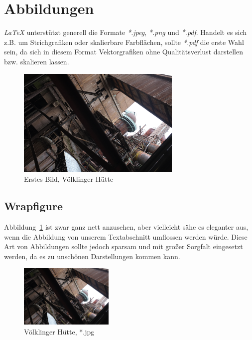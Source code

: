 \section{Abbildungen}

\textit{LaTeX} unterstützt generell die Formate \textit{*.jpeg}, \textit{*.png} und \textit{*.pdf}.
Handelt es sich z.B. um Strichgrafiken oder skalierbare Farbflächen, sollte \textit{*.pdf} die erste Wahl sein,
da sich in diesem Format Vektorgrafiken ohne Qualitätsverlust darstellen bzw. skalieren lassen.

\begin{figure}[bth] 
  \centering
  \includegraphics[width=0.7\textwidth]{Examples/example_5.png}
  \caption{Erstes Bild, Völklinger Hütte}
  \label{fig:Huette}
\end{figure}


\subsection{Wrapfigure}
Abbildung~\ref{fig:Huette} ist zwar ganz nett anzusehen, aber vielleicht sähe es eleganter aus, wenn die Abbildung 
von unserem Textabschnitt umflossen werden würde. Diese Art von Abbildungen sollte jedoch sparsam und mit großer Sorgfalt eingesetzt werden, da es zu unschönen Darstellungen kommen kann.
\blindtext
\begin{figure}
  \centering
  \includegraphics[width=0.4\textwidth]{Examples/example_5.jpg}
  \caption{Völklinger Hütte, *.jpg}
  \label{fig:Huette2}
\end{figure}
\blindtext


